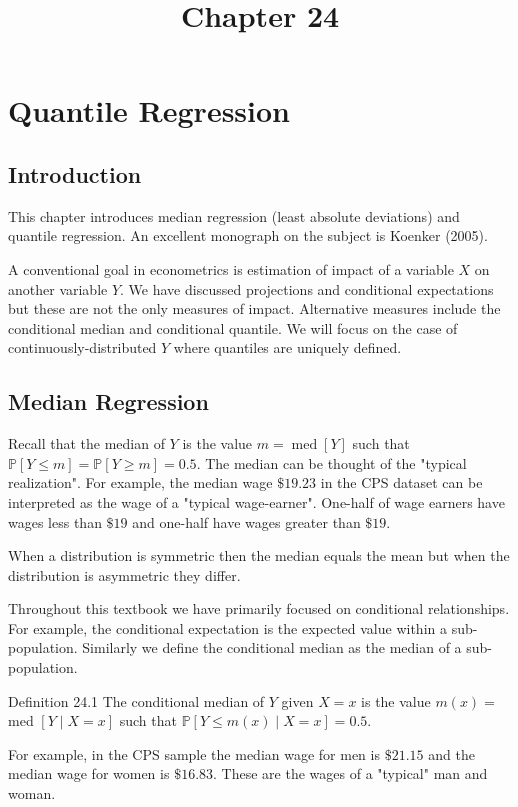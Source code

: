 \documentclass[10pt]{article}
\title{Chapter 24 }
\author{}
\date{}
\begin{document}
\maketitle
\section{Quantile Regression}
\subsection{Introduction}
This chapter introduces median regression (least absolute deviations) and quantile regression. An excellent monograph on the subject is Koenker (2005).

A conventional goal in econometrics is estimation of impact of a variable $X$ on another variable $Y$. We have discussed projections and conditional expectations but these are not the only measures of impact. Alternative measures include the conditional median and conditional quantile. We will focus on the case of continuously-distributed $Y$ where quantiles are uniquely defined.

\subsection{Median Regression}
Recall that the median of $Y$ is the value $m=\operatorname{med}[Y]$ such that $\mathbb{P}[Y \leq m]=\mathbb{P}[Y \geq m]=0.5$. The median can be thought of the "typical realization". For example, the median wage $\$ 19.23$ in the CPS dataset can be interpreted as the wage of a "typical wage-earner". One-half of wage earners have wages less than $\$ 19$ and one-half have wages greater than $\$ 19$.

When a distribution is symmetric then the median equals the mean but when the distribution is asymmetric they differ.

Throughout this textbook we have primarily focused on conditional relationships. For example, the conditional expectation is the expected value within a sub-population. Similarly we define the conditional median as the median of a sub-population.

Definition 24.1 The conditional median of $Y$ given $X=x$ is the value $m(x)=$ med $[Y \mid X=x]$ such that $\mathbb{P}[Y \leq m(x) \mid X=x]=0.5$.

For example, in the CPS sample the median wage for men is $\$ 21.15$ and the median wage for women is $\$ 16.83$. These are the wages of a "typical" man and woman.
\end{document}
